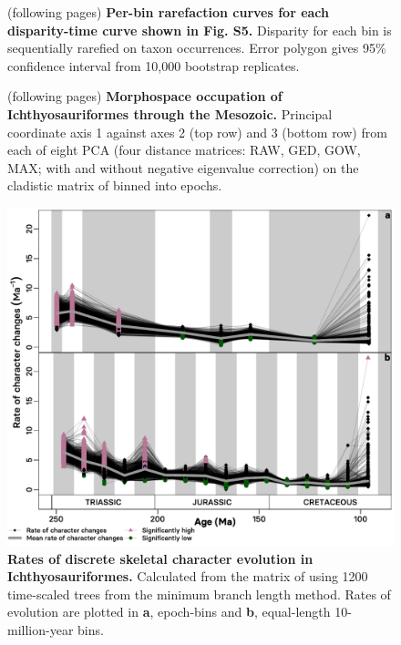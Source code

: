 \documentclass[british,a4paper]{article}
\begin{document}

\FloatBarrier

\begin{figure}[h]
    \caption[Per-bin rarefaction curves for each disparity-time curve shown in Fig.\ 5]{(following pages) \textbf{Per-bin rarefaction curves for each disparity-time curve shown in Fig. S5.} Disparity for each bin is sequentially rarefied on taxon occurrences. Error polygon gives 95\% confidence interval from 10,000 bootstrap replicates.\label{fig:rarefaction-curves}}
\end{figure}
\FloatBarrier


\FloatBarrier

\begin{figure}[h]
    \caption[Morphospace occupation of Ichthyosauriformes through the Mesozoic]{(following pages) \textbf{Morphospace occupation of Ichthyosauriformes through the Mesozoic.} Principal coordinate axis 1 against axes 2 (top row) and 3 (bottom row) from each of eight PCA (four distance matrices: RAW, GED, GOW, MAX; with and without negative eigenvalue correction) on the cladistic matrix of \textcite{Moon2019a} binned into epochs.\label{fig:morphospace-plots}}
\end{figure}
\FloatBarrier




\begin{figure}[h]
    \includegraphics[width = \textwidth, center]{supp_figures/figS8-rates_MBLspaghetti}
    \caption[Rates of discrete skeletal character evolution in Ichthyosauriformes]{\textbf{Rates of discrete skeletal character evolution in Ichthyosauriformes.} Calculated from the matrix of \textcite{Moon2019a} using 1200 time-scaled trees from the minimum branch length method. Rates of evolution are plotted in \textbf{a}, epoch-bins and \textbf{b}, equal-length 10-million-year bins. \label{fig:mbl-discrete-rates}} 
\end{figure}
\end{document}
